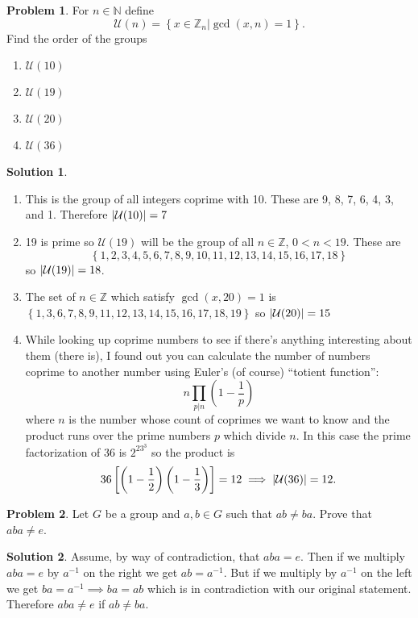 \documentclass[10pt]{article}
\theoremstyle{definition}
\newtheorem{problem}{Problem}
\newtheorem{soln}{Solution}
\begin{document}
\begin{problem}
For $n\in \mathbb{N}$ define
$$\mathcal{U}(n)=\left\{\left.x\in\mathbb{Z}_n\right|\gcd(x,n)=1\right\}.$$
Find the order of the groups
\begin{enumerate}[label=(\alph*)]
  \item $\mathcal{U}(10)$
  \item $\mathcal{U}(19)$
  \item $\mathcal{U}(20)$
  \item $\mathcal{U}(36)$
\end{enumerate}
\end{problem}
\begin{soln}~
  \begin{enumerate}[label=(\alph*)]
    \item This is the group of all integers coprime with 10. These are 9, 8, 7, 6, 4, 3, and 1. Therefore $\abs{\mathcal{U}(10)}=7$
    \item 19 is prime so $\mathcal{U}(19)$ will be the group of all $n\in\mathbb{Z}$, $0< n< 19$. These
          are $$\left\{1,2,3,4,5,6,7,8,9,10,11,12,13,14,15,16,17,18\right\}$$ so $\abs{\mathcal{U}(19)}=18$.
    \item The set of $n\in\mathbb{Z}$ which satisfy $\gcd(x,20)=1$ is $\left\{1,3,6,7,8,9,11,12,13,14,15,16,17,18,19\right\}$
          so $\abs{\mathcal{U}(20)}=15$
    \item While looking up coprime numbers to see if there's anything interesting about them (there is), I found out you can
          calculate the number of numbers coprime to another number using Euler's (of course) ``totient function'':
          $$n\prod_{p|n}(1-\frac{1}{p})$$
          where $n$ is the number whose count of coprimes we want to know and the product runs over the  prime numbers $p$ which divide $n$.
          In this case the prime factorization of 36 is $2^23^3$ so the product is
          $$36\left[\left(1-\frac{1}{2}\right)\left(1-\frac{1}{3}\right)\right]=12\implies \abs{\mathcal{U}(36)}=12.$$
  \end{enumerate}
\end{soln}

\begin{problem}
Let $G$ be a group and $a,b\in G$ such that $ab\neq ba$. Prove that $aba\neq e$.
\end{problem}
\begin{soln}
  Assume, by way of contradiction, that $aba=e$. Then if we multiply $aba=e$ by $a^{-1}$ on the right we get $ab=a^{-1}$.
  But if we multiply by $a^{-1}$ on the left we get $ba=a^{-1}\implies ba=ab$ which is in contradiction with our original statement.
  Therefore $aba\neq e$ if $ab\neq ba$.
\end{soln}
\end{document}

